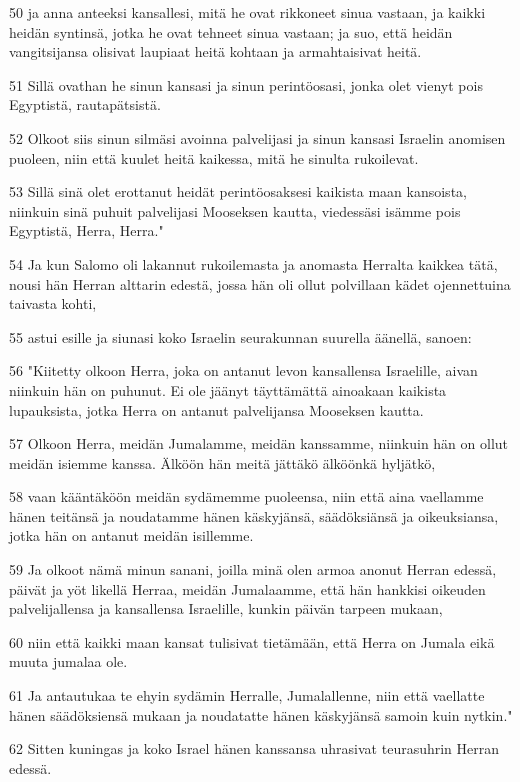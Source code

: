 \par 50 ja anna anteeksi kansallesi, mitä he ovat rikkoneet sinua vastaan, ja kaikki heidän syntinsä, jotka he ovat tehneet sinua vastaan; ja suo, että heidän vangitsijansa olisivat laupiaat heitä kohtaan ja armahtaisivat heitä.
\par 51 Sillä ovathan he sinun kansasi ja sinun perintöosasi, jonka olet vienyt pois Egyptistä, rautapätsistä.
\par 52 Olkoot siis sinun silmäsi avoinna palvelijasi ja sinun kansasi Israelin anomisen puoleen, niin että kuulet heitä kaikessa, mitä he sinulta rukoilevat.
\par 53 Sillä sinä olet erottanut heidät perintöosaksesi kaikista maan kansoista, niinkuin sinä puhuit palvelijasi Mooseksen kautta, viedessäsi isämme pois Egyptistä, Herra, Herra."
\par 54 Ja kun Salomo oli lakannut rukoilemasta ja anomasta Herralta kaikkea tätä, nousi hän Herran alttarin edestä, jossa hän oli ollut polvillaan kädet ojennettuina taivasta kohti,
\par 55 astui esille ja siunasi koko Israelin seurakunnan suurella äänellä, sanoen:
\par 56 "Kiitetty olkoon Herra, joka on antanut levon kansallensa Israelille, aivan niinkuin hän on puhunut. Ei ole jäänyt täyttämättä ainoakaan kaikista lupauksista, jotka Herra on antanut palvelijansa Mooseksen kautta.
\par 57 Olkoon Herra, meidän Jumalamme, meidän kanssamme, niinkuin hän on ollut meidän isiemme kanssa. Älköön hän meitä jättäkö älköönkä hyljätkö,
\par 58 vaan kääntäköön meidän sydämemme puoleensa, niin että aina vaellamme hänen teitänsä ja noudatamme hänen käskyjänsä, säädöksiänsä ja oikeuksiansa, jotka hän on antanut meidän isillemme.
\par 59 Ja olkoot nämä minun sanani, joilla minä olen armoa anonut Herran edessä, päivät ja yöt likellä Herraa, meidän Jumalaamme, että hän hankkisi oikeuden palvelijallensa ja kansallensa Israelille, kunkin päivän tarpeen mukaan,
\par 60 niin että kaikki maan kansat tulisivat tietämään, että Herra on Jumala eikä muuta jumalaa ole.
\par 61 Ja antautukaa te ehyin sydämin Herralle, Jumalallenne, niin että vaellatte hänen säädöksiensä mukaan ja noudatatte hänen käskyjänsä samoin kuin nytkin."
\par 62 Sitten kuningas ja koko Israel hänen kanssansa uhrasivat teurasuhrin Herran edessä.
